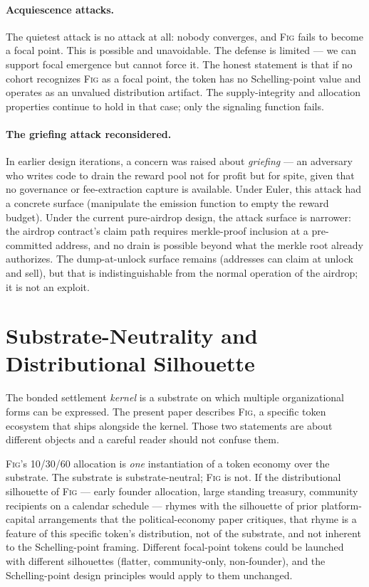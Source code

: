 \documentclass[11pt,a4paper]{article}
\theoremstyle{definition}
\theoremstyle{remark}
\newcommand{\fig}{\textsc{Fig}}
\begin{document}
\paragraph{Acquiescence attacks.}
The quietest attack is no attack at all: nobody converges, and
\fig{} fails to become a focal point. This is possible and
unavoidable. The defense is limited --- we can support focal
emergence but cannot force it. The honest statement is that if
no cohort recognizes \fig{} as a focal point, the token has no
Schelling-point value and operates as an unvalued distribution
artifact. The supply-integrity and allocation properties
continue to hold in that case; only the signaling function
fails.

\paragraph{The griefing attack reconsidered.}
In earlier design iterations, a concern was raised about
\emph{griefing} --- an adversary who writes code to drain the
reward pool not for profit but for spite, given that no
governance or fee-extraction capture is available. Under Euler,
this attack had a concrete surface (manipulate the emission
function to empty the reward budget). Under the current
pure-airdrop design, the attack surface is narrower: the
airdrop contract's claim path requires merkle-proof inclusion
at a pre-committed address, and no drain is possible beyond
what the merkle root already authorizes. The
dump-at-unlock surface remains (addresses can claim at unlock
and sell), but that is indistinguishable from the normal
operation of the airdrop; it is not an exploit.

\section{Substrate-Neutrality and Distributional Silhouette}
\label{sec:silhouette}

The bonded settlement \emph{kernel} is a substrate on which
multiple organizational forms can be expressed. The present
paper describes \fig{}, a specific token ecosystem that ships
alongside the kernel. Those two statements are about different
objects and a careful reader should not confuse them.

\fig{}'s 10/30/60 allocation is \emph{one} instantiation of a
token economy over the substrate. The substrate is
substrate-neutral; \fig{} is not. If the distributional
silhouette of \fig{} --- early founder allocation, large
standing treasury, community recipients on a calendar schedule
--- rhymes with the silhouette of prior platform-capital
arrangements that the political-economy paper critiques, that
rhyme is a feature of this specific token's distribution, not
of the substrate, and not inherent to the Schelling-point
framing. Different focal-point tokens could be launched with
different silhouettes (flatter, community-only, non-founder),
and the Schelling-point design principles would apply to them
unchanged.
\end{document}
